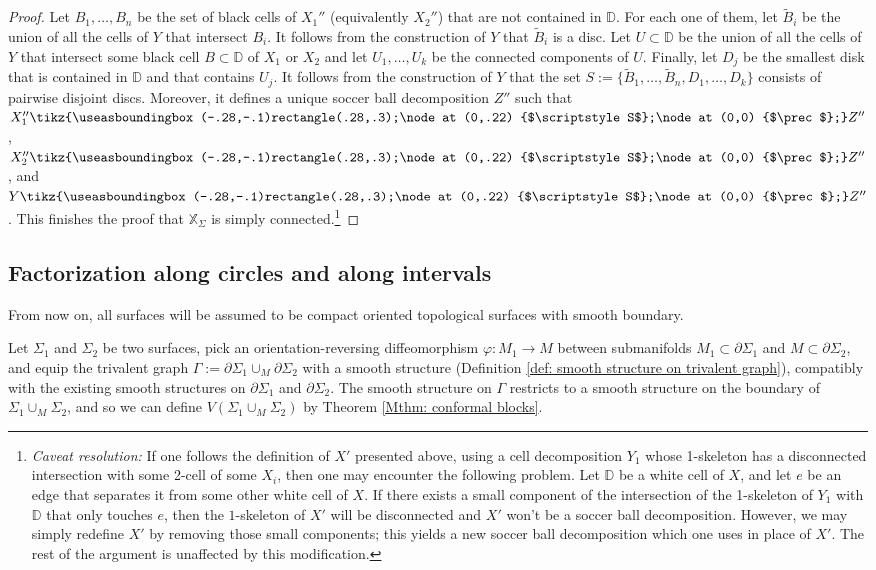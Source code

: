 \documentclass[a4paper,10pt,leqno]{amsart}
\newcommand{\ID}{\mathbb{D}}     \newcommand{\cald}{\mathcal{D}}
\newcommand{\IX}{\mathbb{X}}     \newcommand{\calx}{\mathcal{X}}
\newcounter{
  counter}
\theoremstyle{plain}
\theoremstyle{definition}
\theoremstyle{remark}
\begin{document}
\begin{proof}
Let $B_1,\ldots,B_n$ be the set of black cells of $X_1''$ (equivalently $X_2''$) that are not contained in $\ID$.
For each one of them, let $\tilde B_i$ be the union of all the cells of $Y$ that intersect $B_i$.
It follows from the construction of $Y$  that $\tilde B_i$ is a disc.
Let $U\subset \ID$ be the union of all the cells of $Y$ that intersect some black cell $B\subset \ID$ of $X_1$ or $X_2$ and let $U_1,\ldots,U_k$ be the connected components of $U$.
Finally, let $D_j$ be the smallest disk that is contained in $\ID$ and that contains $U_j$.
It follows from the construction of $Y$ that the set $S:=\{\tilde B_1,\ldots,\tilde B_n, D_1,\ldots, D_k\}$ consists of pairwise disjoint discs.
Moreover, it defines a unique soccer ball decomposition $Z''$ such that 
$X_1''\tikz{\useasboundingbox(-.28,-.1)rectangle(.28,.3);\node at (0,.22) {$\scriptstyle S$};\node at (0,0) {$\prec$};} Z''$,
$X_2''\tikz{\useasboundingbox(-.28,-.1)rectangle(.28,.3);\node at (0,.22) {$\scriptstyle S$};\node at (0,0) {$\prec$};} Z''$,
and
$Y\tikz{\useasboundingbox(-.28,-.1)rectangle(.28,.3);\node at (0,.22) {$\scriptstyle S$};\node at (0,0) {$\prec$};} Z''$.
This finishes the proof that $\IX_\Sigma$ is simply connected.\footnote{\label{cavaetresolved}{\it Caveat resolution:} If one follows the definition of $X'$ presented above, using a cell decomposition $Y_1$ whose 1-skeleton has a disconnected intersection with some 2-cell of some $X_i$, then one may encounter the following problem.
Let $\ID$ be a white cell of $X$, and let $e$ be an edge that separates it from some other white cell of $X$.
If there  exists a small component of the intersection of the 1-skeleton of $Y_1$ with $\ID$ that only touches $e$, then the $1$-skeleton of $X'$ will be disconnected and $X'$ won't be a soccer ball decomposition.  However, we may simply redefine $X'$ by removing those small components; this yields a new soccer ball decomposition which one uses in place of $X'$.
The rest of the argument is unaffected by this modification.}
\end{proof}



\subsection{Factorization along circles and along intervals}

From now on, all surfaces will be assumed to be compact oriented topological surfaces with smooth boundary.

Let $\Sigma_1$ and $\Sigma_2$ be two surfaces, pick an orientation-reversing diffeomorphism $\varphi:M_1\to M$ between submanifolds $M_1\subset \partial \Sigma_1$ and $M\subset \partial \Sigma_2$, 
and equip the trivalent graph $\Gamma:=\partial \Sigma_1\cup_M \partial \Sigma_2$ with a smooth structure (Definition \ref{def: smooth structure on trivalent graph}), compatibly with the existing smooth structures on $\partial \Sigma_1$ and $\partial \Sigma_2$.
The smooth structure on $\Gamma$ restricts to a smooth structure on the boundary of $\Sigma_1\cup_M \Sigma_2$,
and so we can define $V(\Sigma_1\cup_M \Sigma_2)$ by Theorem \ref{Mthm: conformal blocks}.
\end{document}
